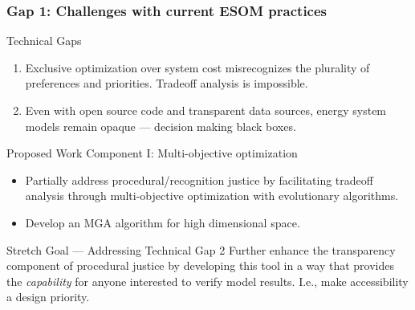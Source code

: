 \begin{frame}
    \frametitle{Gap 1: Challenges with current ESOM practices}
    \begin{block}{Technical Gaps}
        \begin{enumerate}
            \item Exclusive optimization over system cost misrecognizes the plurality of 
            preferences and priorities. Tradeoff analysis is impossible.
            \item Even with open source code and transparent data sources, energy system
            models remain opaque --- decision making black boxes.
        \end{enumerate}
    \end{block}
    \begin{block}{Proposed Work Component I: Multi-objective optimization}
        \begin{itemize}
            \item Partially address procedural/recognition justice by facilitating tradeoff analysis 
            through multi-objective optimization with evolutionary
            algorithms.
            \item Develop an MGA algorithm for high dimensional space.
        \end{itemize}
        
    \end{block}
    \begin{block}{Stretch Goal --- Addressing Technical Gap 2}
        Further enhance the transparency component of procedural justice by developing this
        tool in a way that provides the \textit{capability} for anyone interested to 
        verify model results. I.e., make accessibility a design priority. 
    \end{block}
\end{frame}